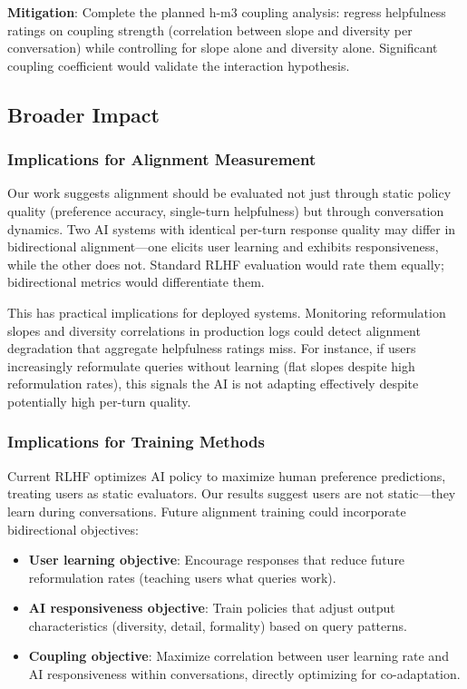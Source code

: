 \textbf{Mitigation}: Complete the planned h-m3 coupling analysis: regress helpfulness ratings on coupling strength (correlation between slope and diversity per conversation) while controlling for slope alone and diversity alone. Significant coupling coefficient would validate the interaction hypothesis.

\subsection{Broader Impact}

\subsubsection{Implications for Alignment Measurement}

Our work suggests alignment should be evaluated not just through static policy quality (preference accuracy, single-turn helpfulness) but through conversation dynamics. Two AI systems with identical per-turn response quality may differ in bidirectional alignment---one elicits user learning and exhibits responsiveness, while the other does not. Standard RLHF evaluation would rate them equally; bidirectional metrics would differentiate them.

This has practical implications for deployed systems. Monitoring reformulation slopes and diversity correlations in production logs could detect alignment degradation that aggregate helpfulness ratings miss. For instance, if users increasingly reformulate queries without learning (flat slopes despite high reformulation rates), this signals the AI is not adapting effectively despite potentially high per-turn quality.

\subsubsection{Implications for Training Methods}

Current RLHF optimizes AI policy to maximize human preference predictions, treating users as static evaluators. Our results suggest users are not static---they learn during conversations. Future alignment training could incorporate bidirectional objectives:

\begin{itemize}
\item \textbf{User learning objective}: Encourage responses that reduce future reformulation rates (teaching users what queries work).
\item \textbf{AI responsiveness objective}: Train policies that adjust output characteristics (diversity, detail, formality) based on query patterns.
\item \textbf{Coupling objective}: Maximize correlation between user learning rate and AI responsiveness within conversations, directly optimizing for co-adaptation.
\end{itemize}

